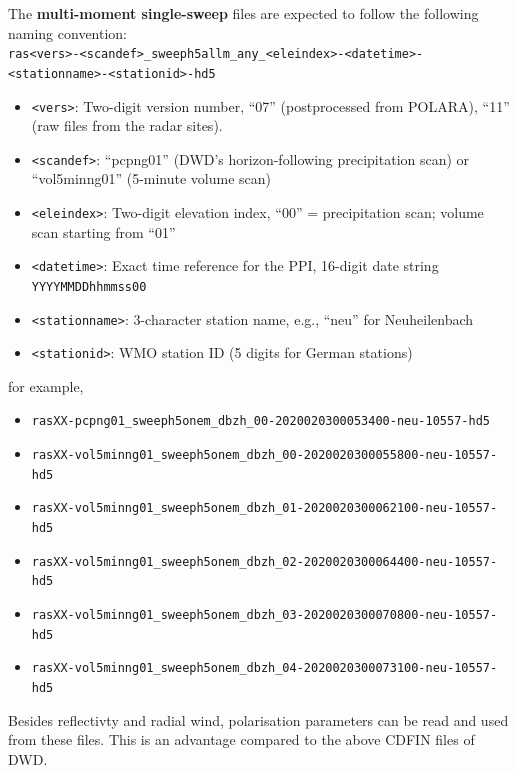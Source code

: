 \documentclass[10pt,a4paper,twoside,headinclude,footinclude,parskip=half]{scrartcl}
\begin{document}
\begin{itemize}
    The \textbf{multi-moment single-sweep} files are expected to follow the following naming convention:\\[0.5em]
    \verb$ras<vers>-<scandef>_sweeph5allm_any_<eleindex>-<datetime>-<stationname>-<stationid>-hd5$
    \begin{itemize}
    \item \verb|<vers>|: Two-digit version number, ``07'' (postprocessed from POLARA), ``11'' (raw files from the radar sites).
    \item \verb|<scandef>|: ``pcpng01'' (DWD's horizon-following precipitation scan) or ``vol5minng01'' (5-minute volume scan)
    \item \verb|<eleindex>|: Two-digit elevation index, ``00'' = precipitation scan; volume scan starting from ``01''
    \item \verb|<datetime>|: Exact time reference for the PPI, 16-digit date string \verb|YYYYMMDDhhmmss00|
    \item \verb|<stationname>|: 3-character station name, e.g., ``neu'' for Neuheilenbach
    \item \verb|<stationid>|: WMO station ID (5 digits for German stations)
    \end{itemize}
    for example,
    \begin{itemize}
    \item \verb|rasXX-pcpng01_sweeph5onem_dbzh_00-2020020300053400-neu-10557-hd5|
    \item \verb|rasXX-vol5minng01_sweeph5onem_dbzh_00-2020020300055800-neu-10557-hd5|
    \item \verb|rasXX-vol5minng01_sweeph5onem_dbzh_01-2020020300062100-neu-10557-hd5|
    \item \verb|rasXX-vol5minng01_sweeph5onem_dbzh_02-2020020300064400-neu-10557-hd5|
    \item \verb|rasXX-vol5minng01_sweeph5onem_dbzh_03-2020020300070800-neu-10557-hd5|
    \item \verb|rasXX-vol5minng01_sweeph5onem_dbzh_04-2020020300073100-neu-10557-hd5|
    \end{itemize}

    Besides reflectivty and radial wind, polarisation parameters can be read and used from these files. This is an advantage compared to the above CDFIN files of DWD.
    

\end{itemize}
\end{document}
